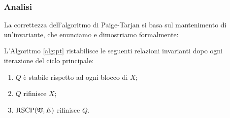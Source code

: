 \subsubsection{Analisi}
La correttezza dell'algoritmo di Paige-Tarjan si basa sul mantenimento di un'invariante, che enunciamo e dimostriamo formalmente:
\begin{lemma}
    \label{lem:pt_qx}
    L'Algoritmo \ref{alg:pt} ristabilisce le seguenti relazioni invarianti dopo ogni iterazione del ciclo principale:
    \begin{enumerate}
        \item $Q$ è stabile rispetto ad ogni blocco di $X$;
        \item $Q$ rifinisce $X$;
        \item $\textup{RSCP}(\mathfrak{V},E)$ rifinisce $Q$.
    \end{enumerate}
\end{lemma}

